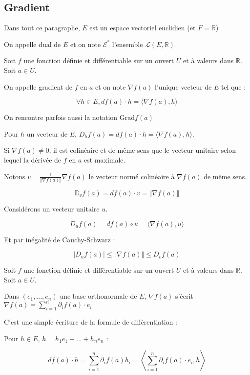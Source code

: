 \documentclass[a4paper,12pt]{book}
\newcommand{\Def}[2]{\begin{tcolorbox}[sharp corners, colback=white,colframe=blue!90!black!75, title=Définition : #1]#2\end{tcolorbox}}
\newcommand{\Prop}[2]{\begin{tcolorbox}[sharp corners, colback=white,colframe=red!90!black!75, title=Proposition : #1]#2\end{tcolorbox}}
\newcommand{\Pre}[1]{\begin{tcolorbox}[sharp corners, colback=white,colframe=green!60!green!30!black!75, title=Preuve]#1\end{tcolorbox}}
\def\R{\mathbb{R}}
\def\D{\mathbb{D}}
\begin{document}
\subsection{Gradient}
Dans tout ce paragraphe, $E$ est un espace vectoriel euclidien (et $F=\R$)
\Def{}{On appelle dual de $E$ et on note $\mathcal{E}^*$ l'ensemble $\mathcal{L}(E,\R)$}
\Def{}{Soit $f$ une fonction définie et différentiable sur un ouvert $U$ et à valeurs dans $\R$. Soit $a\in U$.
\par On appelle gradient de $f$ en $a$ et on note $\nabla f(a)$ l'unique vecteur de $E$ tel que :
\par $$\forall h\in E, df(a)\cdot h=\langle \nabla f(a), h\rangle$$}
On rencontre parfois aussi la notation $\mathrm{Grad}f(a)$
\Prop{Interprétation géométrique du gradient}{Pour $h$ un vecteur de $E$, $D_hf(a)= df(a)\cdot h = \langle \nabla f(a), h\rangle$.
\par Si $\nabla f(a)\neq 0$, il est colinéaire et de même sens que le vecteur unitaire selon lequel la dérivée de $f$ en $a$ est maximale.}
\Pre{Notons $v = \frac{1}{\Vert\nabla f(a)\Vert}\nabla f(a)$ le vecteur normé colinéaire à $\nabla f(a)$ de même sens.
\par $$\D_vf(a) = df(a)\cdot v = \Vert\nabla f(a)\Vert$$
\par Considérons un vecteur unitaire $u$.
\par $$D_uf(a) = df(a)\circ u = \langle \nabla f(a), u\rangle$$
\par Et par inégalité de Cauchy-Schwarz :
\par $$\vert D_uf(a)\vert\leq \Vert\nabla f(a)\Vert \leq D_vf(a)$$}
\Prop{}{Soit $f$ une fonction définie et différentiable sur un ouvert $U$ et à valeurs dans $\R$. Soit $a\in U$.
\par Dans $(e_1,..., e_n)$ une base orthonormale de $E$, $\nabla f(a)$ s'écrit $\nabla f(a) = \sum\limits_{i=1}^n\partial_if(a)\cdot e_i$}
\Pre{C'est une simple écriture de la formule de différentiation :
\par Pour $h\in E$, $h= h_1e_1+...+h_ne_n$ :
\par $$df(a)\cdot h =\sum\limits_{i=1}^n\partial_if(a)h_i = \left\langle\sum\limits_{i=1}^n\partial_if(a)\cdot e_i, h\right\rangle$$}
\end{document}
